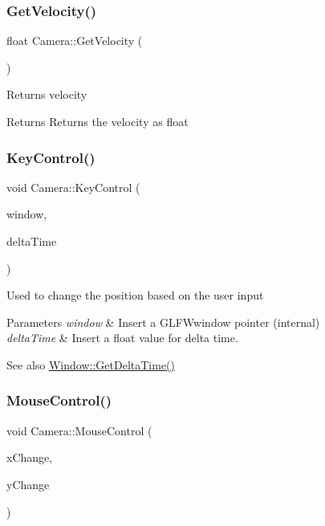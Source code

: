 \subsubsection{\texorpdfstring{GetVelocity()}{GetVelocity()}}
{\footnotesize\ttfamily float Camera\+::\+Get\+Velocity (\begin{DoxyParamCaption}{ }\end{DoxyParamCaption})}

Returns velocity \begin{DoxyReturn}{Returns}
Returns the velocity as float 
\end{DoxyReturn}
\mbox{\label{class_camera_a68dfb40f9e073eafb27c40549c3501a6}} 
\subsubsection{\texorpdfstring{KeyControl()}{KeyControl()}}
{\footnotesize\ttfamily void Camera\+::\+Key\+Control (\begin{DoxyParamCaption}\item[{G\+L\+F\+Wwindow $\ast$}]{window,  }\item[{float}]{delta\+Time }\end{DoxyParamCaption})}

Used to change the position based on the user input 
\begin{DoxyParams}{Parameters}
{\em window} & Insert a G\+L\+F\+Wwindow pointer (internal) \\
\hline
{\em delta\+Time} & Insert a float value for delta time. \\
\hline
\end{DoxyParams}
\begin{DoxySeeAlso}{See also}
\mbox{\hyperlink{class_window_ae7ce0586147cc93ba68d6ee929413f22}{Window\+::\+Get\+Delta\+Time()}} 
\end{DoxySeeAlso}
\mbox{\label{class_camera_a3d5110ad37f5d75dd278ece789841d38}} 
\subsubsection{\texorpdfstring{MouseControl()}{MouseControl()}}
{\footnotesize\ttfamily void Camera\+::\+Mouse\+Control (\begin{DoxyParamCaption}\item[{float}]{x\+Change,  }\item[{float}]{y\+Change }\end{DoxyParamCaption})}

